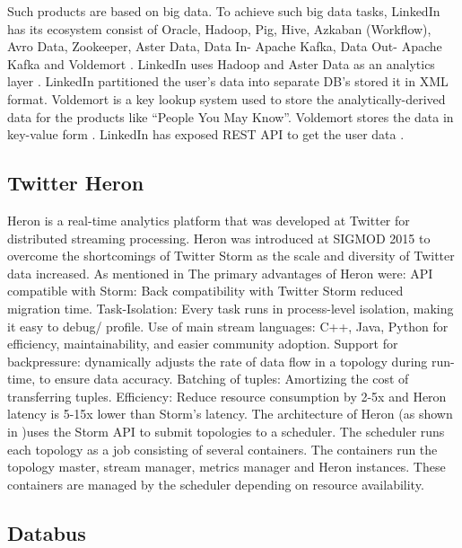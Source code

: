      Such products are based on big data. To achieve such big data
     tasks, LinkedIn has its ecosystem consist of Oracle, Hadoop, Pig,
     Hive, Azkaban (Workflow), Avro Data, Zookeeper, Aster Data,
     Data In- Apache Kafka, Data Out- Apache Kafka and Voldemort
     \cite{www-linkedinbigdata}. LinkedIn uses Hadoop and Aster Data
     as an analytics layer \cite{www-linkedinquora}. LinkedIn
     partitioned the user’s data into separate DB’s stored it in XML
     format. Voldemort is a key lookup system used to store the
     analytically-derived data for the products like ``People You
     May Know''. Voldemort stores the data in key-value form
     \cite{www-linkedinquora}. LinkedIn has exposed REST
     API to get the user data \cite{www-linkedindevelopers}.

\subsection{Twitter Heron}

     Heron is a real-time analytics platform that was developed at
     Twitter for distributed streaming processing. Heron was
     introduced at SIGMOD 2015 to overcome the shortcomings of Twitter
     Storm as the scale and diversity of Twitter data increased. As
     mentioned in \cite{www-TwitterHeronOpen} The primary advantages
     of Heron were: API compatible with Storm: Back compatibility with
     Twitter Storm reduced migration time. Task-Isolation: Every task
     runs in process-level isolation, making it easy to debug/
     profile. Use of main stream languages: C++, Java, Python for
     efficiency, maintainability, and easier community
     adoption. Support for backpressure: dynamically adjusts the rate
     of data flow in a topology during run-time, to ensure data
     accuracy. Batching of tuples: Amortizing the cost of transferring
     tuples. Efficiency: Reduce resource consumption by 2-5x and Heron
     latency is 5-15x lower than Storm’s latency. The architecture of
     Heron (as shown in \cite{www-TwitterHeron})uses the Storm API to
     submit topologies to a scheduler. The scheduler runs each
     topology as a job consisting of several containers. The
     containers run the topology master, stream manager, metrics
     manager and Heron instances. These containers are managed by the
     scheduler depending on resource availability.
     
\subsection{Databus}
